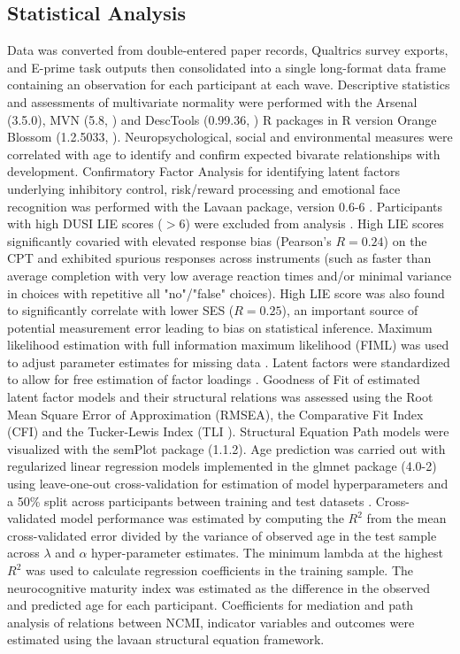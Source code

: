 \documentclass[utf8]{frontiersSCNS} %
\begin{document}
\subsection{Statistical Analysis} Data was converted from double-entered paper records, Qualtrics survey exports, and E-prime task outputs then consolidated into a single long-format data frame containing an observation for each participant at each wave. Descriptive statistics and assessments of multivariate normality were performed with the Arsenal (3.5.0), MVN (5.8, \cite{MVN}) and DescTools (0.99.36, \cite{DescTools}) R packages in R version Orange Blossom (1.2.5033, \cite{R}). Neuropsychological, social and environmental measures were correlated with age to identify and confirm expected bivarate relationships with development. Confirmatory Factor Analysis for identifying latent factors underlying inhibitory control, risk/reward processing and emotional face recognition was performed with the Lavaan package, version 0.6-6 \citep{Lavaan}. Participants with high DUSI LIE scores ($>6$) were excluded from analysis \cite{dalla2003effects}. High LIE scores significantly covaried with elevated response bias (Pearson's $R=0.24$) on the CPT and exhibited spurious responses across instruments (such as faster than average completion with very low average reaction times and/or minimal variance in choices with repetitive all "no"/"false" choices). High LIE score was also found to significantly correlate with lower SES ($R=0.25$), an important source of potential measurement error leading to bias on statistical inference.  Maximum likelihood estimation with full information maximum likelihood (FIML) was used to adjust parameter estimates for missing data \citep{cham2017full}. Latent factors were standardized to allow for free estimation of factor loadings \citep{HuTzeBentler1998}. Goodness of Fit of estimated latent factor models and their structural relations was assessed using the Root Mean Square Error of Approximation (RMSEA), the Comparative Fit Index (CFI) and the Tucker-Lewis Index (TLI \cite{KennyEtAl2015,HuTzeBentler1999}). Structural Equation Path models were visualized with the semPlot package (1.1.2). Age prediction was carried out with regularized linear regression models implemented in the glmnet package (4.0-2) using leave-one-out cross-validation for estimation of model hyperparameters and a 50\% split across participants between training and test datasets \citep{FriedmanHastieTibshirani2010, friedman2009glmnet}. Cross-validated model performance was estimated by computing the $R^2$ from the mean cross-validated error divided by the variance of observed age in the test sample across $\lambda$ and $\alpha$ hyper-parameter estimates. The minimum lambda at the highest $R^2$ was used to calculate regression coefficients in the training sample. The neurocognitive maturity index was estimated as the difference in the observed and predicted age for each participant. Coefficients for mediation and path analysis of relations between NCMI, indicator variables and outcomes were estimated using the lavaan structural equation framework.
\end{document}
